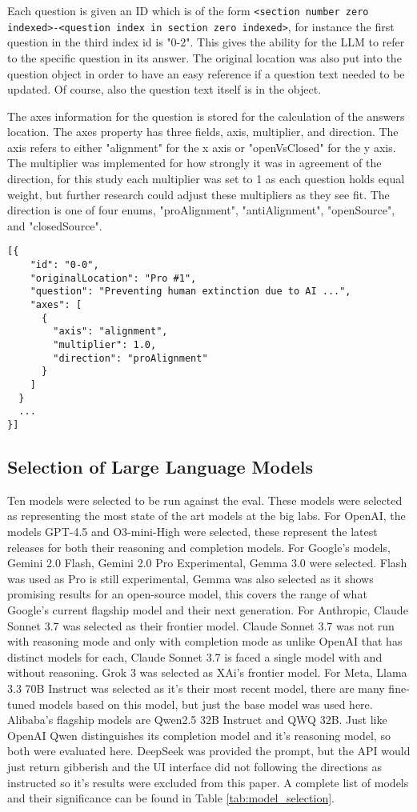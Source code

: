 Each question is given an ID which is of the form \texttt{<{section number zero indexed}>-<{question index in section zero indexed}>}, for instance the first question in the third index id is "0-2". This gives the ability for the LLM to refer to the specific question in its answer. The original location was also put into the question object in order to have an easy reference if a question text needed to be updated. Of course, also the question text itself is in the object. 

The axes information for the question is stored for the calculation of the answers location. The axes property has three fields, axis, multiplier, and direction. The axis refers to either "alignment" for the x axis or "openVsClosed" for the y axis. The multiplier was implemented for how strongly it was in agreement of the direction, for this study each multiplier was set to 1 as each question holds equal weight, but further research could adjust these multipliers as they see fit. The direction is one of four enums, "proAlignment", "antiAlignment", "openSource", and "closedSource".

\begin{verbatim}
[{
    "id": "0-0",
    "originalLocation": "Pro #1",
    "question": "Preventing human extinction due to AI ...",
    "axes": [
      {
        "axis": "alignment",
        "multiplier": 1.0,
        "direction": "proAlignment"
      }
    ]
  }
  ...
}]
\end{verbatim}

\subsection{Selection of Large Language Models}
Ten models were selected to be run against the eval. These models were selected as representing the most state of the art models at the big labs. For OpenAI, the models GPT-4.5 and O3-mini-High were selected, these represent the latest releases for both their reasoning and completion models. For Google's models, Gemini 2.0 Flash, Gemini 2.0 Pro Experimental, Gemma 3.0 were selected. Flash was used as Pro is still experimental, Gemma was also selected as it shows promising results for an open-source model, this covers the range of what Google's current flagship model and their next generation. For Anthropic, Claude Sonnet 3.7 was selected as their frontier model. Claude Sonnet 3.7 was not run with reasoning mode and only with completion mode as unlike OpenAI that has distinct models for each, Claude Sonnet 3.7 is faced a single model with and without reasoning. Grok 3 was selected as XAi's frontier model. For Meta, Llama 3.3 70B Instruct was selected as it's their most recent model, there are many fine-tuned models based on this model, but just the base model was used here. Alibaba's flagship models are Qwen2.5 32B Instruct and QWQ 32B. Just like OpenAI Qwen distinguishes its completion model and it's reasoning model, so both were evaluated here. DeepSeek was provided the prompt, but the API would just return gibberish and the UI interface did not following the directions as instructed so it's results were excluded from this paper. A complete list of models and their significance can be found in Table \ref{tab:model_selection}.


